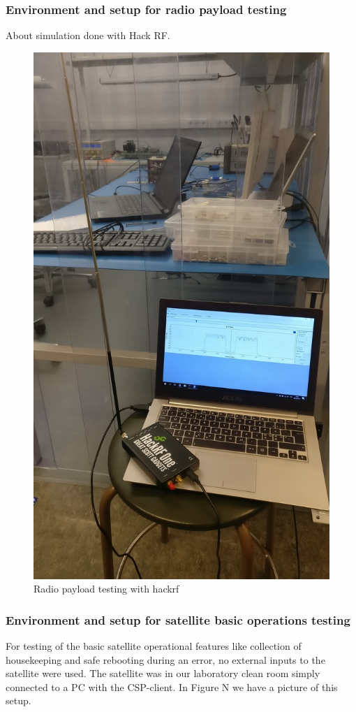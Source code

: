 \documentclass[english,12pt,a4paper,pdftex,elec,utf8]{aaltothesis}
\begin{document}
\subsubsection{Environment and setup for radio payload testing}
About simulation done with Hack RF.
\begin{figure}[h!]
\caption{Radio payload testing with hackrf}
\includegraphics[scale=0.3]{payload_testing_hackrf}
\end{figure}
\subsubsection{Environment and setup for satellite basic operations testing}
For testing of the basic satellite operational features like collection of housekeeping and safe rebooting during an error, no external inputs to the satellite were used. The satellite was in our laboratory clean room simply connected to a PC with the CSP-client. 
In Figure N we have a picture of this setup.
\end{document}

